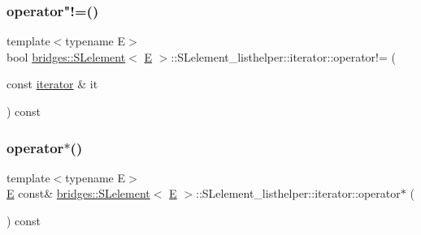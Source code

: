 \subsubsection{\texorpdfstring{operator"!=()}{operator!=()}}
{\footnotesize\ttfamily template$<$typename E$>$ \\
bool \hyperlink{classbridges_1_1_s_lelement}{bridges\+::\+S\+Lelement}$<$ \hyperlink{namespacebridges_acfb0a4f7877d8f63de3e6862004c50eda3a3ea00cfc35332cedf6e5e9a32e94da}{E} $>$\+::S\+Lelement\+\_\+listhelper\+::iterator\+::operator!= (\begin{DoxyParamCaption}\item[{const \hyperlink{classbridges_1_1_s_lelement_1_1_s_lelement__listhelper_1_1iterator}{iterator} \&}]{it }\end{DoxyParamCaption}) const\hspace{0.3cm}{\ttfamily [inline]}}

\mbox{\label{classbridges_1_1_s_lelement_1_1_s_lelement__listhelper_1_1iterator_a29db05550a69e20bec4627d36c5e31c2}} 
\subsubsection{\texorpdfstring{operator$\ast$()}{operator*()}\hspace{0.1cm}{\footnotesize\ttfamily [1/2]}}
{\footnotesize\ttfamily template$<$typename E$>$ \\
\hyperlink{namespacebridges_acfb0a4f7877d8f63de3e6862004c50eda3a3ea00cfc35332cedf6e5e9a32e94da}{E} const\& \hyperlink{classbridges_1_1_s_lelement}{bridges\+::\+S\+Lelement}$<$ \hyperlink{namespacebridges_acfb0a4f7877d8f63de3e6862004c50eda3a3ea00cfc35332cedf6e5e9a32e94da}{E} $>$\+::S\+Lelement\+\_\+listhelper\+::iterator\+::operator$\ast$ (\begin{DoxyParamCaption}{ }\end{DoxyParamCaption}) const\hspace{0.3cm}{\ttfamily [inline]}}

\mbox{\label{classbridges_1_1_s_lelement_1_1_s_lelement__listhelper_1_1iterator_aa4278871d939b261e8871ad95cb09756}} 

